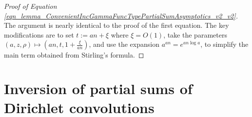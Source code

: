 \documentclass[11pt,reqno,a4letter]{article}
\numberwithin{equation}{section}
\numberwithin{figure}{section}
\numberwithin{table}{section}
\theoremstyle{plain}
\numberwithin{theorem}{section}
\theoremstyle{definition}
\theoremstyle{remark}
\begin{document}
\begin{proof}[Proof of Equation \eqref{eqn_lemma_ConvenientIncGammaFuncTypePartialSumAsymptotics_v2_v2}]
The argument is nearly identical to the proof of the first equation. 
The key modifications are to set $t := an + \xi$ where $\xi = O(1)$, take the parameters 
$\left(a, z, \rho\right) \mapsto \left(an, t, 1 + \frac{\xi}{an}\right)$, and 
use the expansion $a^{an} = e^{an \log a}$, to simplify the main term obtained 
from Stirling's formula. 
\end{proof}

\section{Inversion of partial sums of Dirichlet convolutions}
\label{Section_PrelimProofs_Config} 
\label{subSection_PrelimProofs_Config_InversionTheorem}
\end{document}
